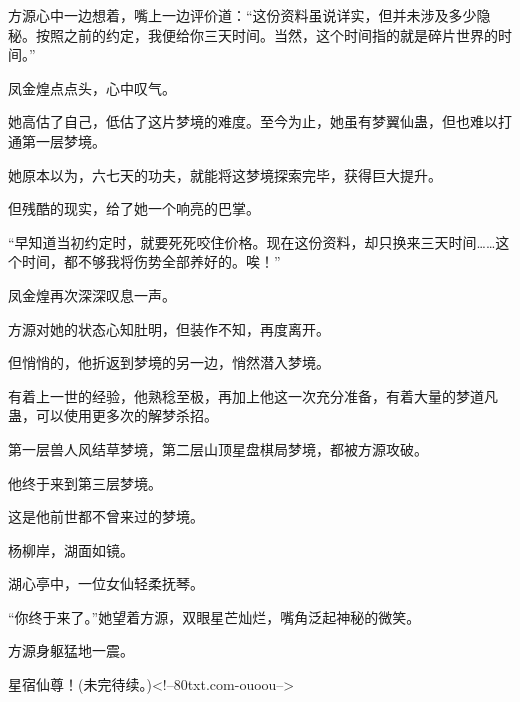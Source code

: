 \begin{this_body}
方源心中一边想着，嘴上一边评价道：“这份资料虽说详实，但并未涉及多少隐秘。按照之前的约定，我便给你三天时间。当然，这个时间指的就是碎片世界的时间。”

凤金煌点点头，心中叹气。

她高估了自己，低估了这片梦境的难度。至今为止，她虽有梦翼仙蛊，但也难以打通第一层梦境。

她原本以为，六七天的功夫，就能将这梦境探索完毕，获得巨大提升。

但残酷的现实，给了她一个响亮的巴掌。

“早知道当初约定时，就要死死咬住价格。现在这份资料，却只换来三天时间……这个时间，都不够我将伤势全部养好的。唉！”

凤金煌再次深深叹息一声。

方源对她的状态心知肚明，但装作不知，再度离开。

但悄悄的，他折返到梦境的另一边，悄然潜入梦境。

有着上一世的经验，他熟稔至极，再加上他这一次充分准备，有着大量的梦道凡蛊，可以使用更多次的解梦杀招。

第一层兽人风结草梦境，第二层山顶星盘棋局梦境，都被方源攻破。

他终于来到第三层梦境。

这是他前世都不曾来过的梦境。

杨柳岸，湖面如镜。

湖心亭中，一位女仙轻柔抚琴。

“你终于来了。”她望着方源，双眼星芒灿烂，嘴角泛起神秘的微笑。

方源身躯猛地一震。

星宿仙尊！(未完待续。)<!--80txt.com-ouoou-->

\end{this_body}

